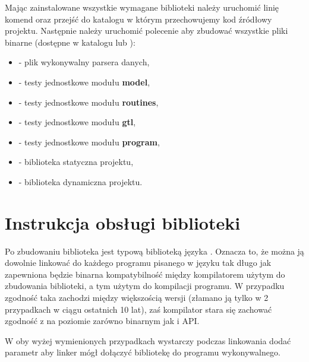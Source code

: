 \documentclass{standalone}
\begin{document}
Mając zainstalowane wszystkie wymagane biblioteki należy uruchomić linię komend oraz przejść do katalogu w którym
przechowujemy kod źródłowy projektu. Następnie należy uruchomić polecenie  aby zbudować wszystkie
pliki binarne (dostępne w katalogu  lub ):
\begin{itemize}
\item {} - plik wykonywalny parsera danych,
\item {} - testy jednostkowe modułu \textbf{model},
\item {} - testy jednostkowe modułu \textbf{routines},
\item {} - testy jednostkowe modułu \textbf{gtl},
\item {} - testy jednostkowe modułu \textbf{program},
\item {} - biblioteka statyczna projektu,
\item {} - biblioteka dynamiczna projektu.
\end{itemize}

\chapter{Instrukcja obsługi biblioteki}

Po zbudowaniu biblioteka jest typową biblioteką języka . Oznacza to, że można ją dowolnie linkować
do każdego programu pisanego w języku  tak długo jak zapewniona będzie binarna kompatybilność między
kompilatorem użytym do zbudowania biblioteki, a tym użytym do kompilacji programu. W przypadku 
zgodność taka zachodzi między większością wersji (złamano ją tylko w 2 przypadkach w ciągu ostatnich 10 lat),
zaś kompilator  stara się zachować zgodność z  na poziomie zarówno binarnym jak i API. 

W oby wyżej wymienionych przypadkach wystarczy podczas linkowania dodać parametr 
aby linker mógł dołączyć bibliotekę do programu wykonywalnego.
\end{document}
